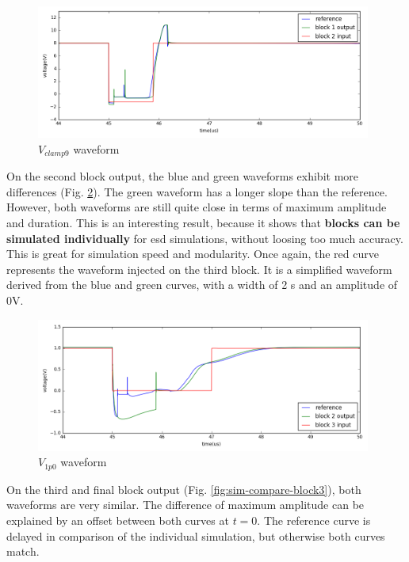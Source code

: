 \begin{figure}[!h]
  \centering
  \includegraphics[width=0.98\textwidth]{src/4/figures/simulation_comparison_block1.png}
  \caption{$V_{clamp9}$ waveform}
  \label{fig:sim-compare-block1}
\end{figure}

On the second block output, the blue and green waveforms exhibit more differences (Fig. \ref{fig:sim-compare-block2}).
The green waveform has a longer slope than the reference.
However, both waveforms are still quite close in terms of maximum amplitude and duration.
This is an interesting result, because it shows that \textbf{blocks can be simulated individually} for \gls{esd} simulations, without loosing too much accuracy.
This is great for simulation speed and modularity.
Once again, the red curve represents the waveform injected on the third block.
It is a simplified waveform derived from the blue and green curves, with a width of 2 \textmugreek{}s and an amplitude of 0V.

\begin{figure}[!h]
  \centering
  \includegraphics[width=0.98\textwidth]{src/4/figures/simulation_comparison_block2.png}
  \caption{$V_{1p0}$ waveform}
  \label{fig:sim-compare-block2}
\end{figure}

On the third and final block output (Fig. \ref{fig:sim-compare-block3}), both waveforms are very similar.
The difference of maximum amplitude can be explained by an offset between both curves at $t=0$.
The reference curve is delayed in comparison of the individual simulation, but otherwise both curves match.

